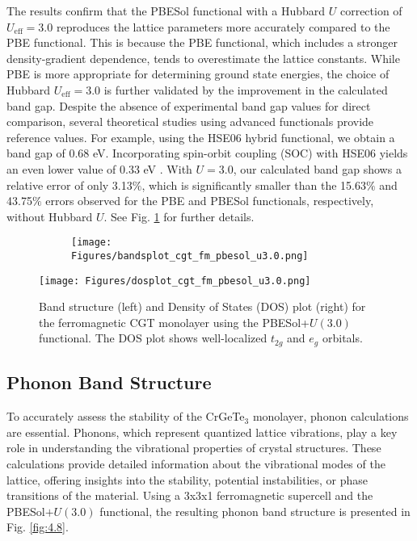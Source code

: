The results confirm that the PBESol functional with a Hubbard $U$ correction of $U_{\text{eff}} = 3.0$ reproduces the lattice parameters more accurately compared to the PBE functional. This is because the PBE functional, which includes a stronger density-gradient dependence, tends to overestimate the lattice constants. While PBE is more appropriate for determining ground state energies, the choice of Hubbard $U_{\text{eff}} = 3.0$ is further validated by the improvement in the calculated band gap. Despite the absence of experimental band gap values for direct comparison, several theoretical studies using advanced functionals provide reference values. For example, using the HSE06 hybrid functional, we obtain a band gap of 0.68 eV. Incorporating spin-orbit coupling (SOC) with HSE06 yields an even lower value of 0.33 eV \supercite{Fang2018}. With $U = 3.0$, our calculated band gap shows a relative error of only 3.13$\%$, which is significantly smaller than the 15.63$\%$ and 43.75$\%$ errors observed for the PBE and PBESol functionals, respectively, without Hubbard $U$. See Fig. \ref{fig:cgtpbesolucorrection} for further details.

\begin{figure}[H]
	\begin{subfigure}{.5\textwidth}
		\centering
		\texttt{[image: Figures/bandsplot\_cgt\_fm\_pbesol\_u3.0.png]}
	\end{subfigure}%
	\begin{minipage}{.5\textwidth}
		\vspace{-12.6cm}
		\centering
		\texttt{[image: Figures/dosplot\_cgt\_fm\_pbesol\_u3.0.png]}
		\captionsetup{justification=centering}
	\end{minipage}
	\caption{Band structure (left) and Density of States (DOS) plot (right) for the ferromagnetic CGT monolayer using the PBESol+$U(3.0)$ functional. The DOS plot shows well-localized $t_{2g}$ and $e_{g}$ orbitals.}
	\label{fig:cgtpbesolucorrection}
\end{figure}


\subsection{Phonon Band Structure}
To accurately assess the stability of the CrGeTe$_3$ monolayer, phonon calculations are essential. Phonons, which represent quantized lattice vibrations, play a key role in understanding the vibrational properties of crystal structures. These calculations provide detailed information about the vibrational modes of the lattice, offering insights into the stability, potential instabilities, or phase transitions of the material. Using a 3x3x1 ferromagnetic supercell and the PBESol$+U(3.0)$ functional, the resulting phonon band structure is presented in Fig. \ref{fig:4.8}.

